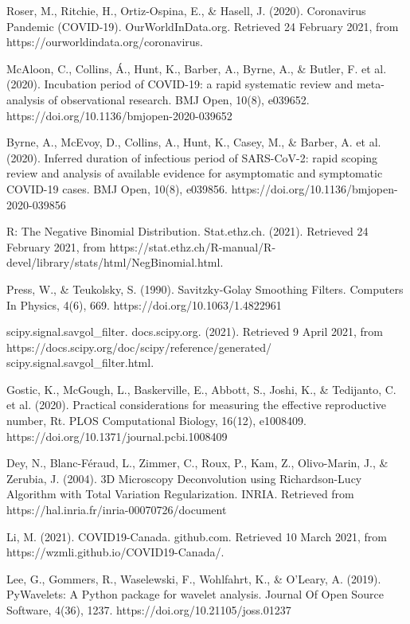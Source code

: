 \documentclass{article}
\begin{document}
{\begin{thebibliography}{2}

Roser, M., Ritchie, H., Ortiz-Ospina, E., \& Hasell, J. (2020). Coronavirus Pandemic (COVID-19). OurWorldInData.org. Retrieved 24 February 2021, from https://ourworldindata.org/coronavirus.

McAloon, C., Collins, Á., Hunt, K., Barber, A., Byrne, A., \& Butler, F. et al. (2020). Incubation period of COVID-19: a rapid systematic review and meta-analysis of observational research. BMJ Open, 10(8), e039652. https://doi.org/10.1136/bmjopen-2020-039652

Byrne, A., McEvoy, D., Collins, A., Hunt, K., Casey, M., \& Barber, A. et al. (2020). Inferred duration of infectious period of SARS-CoV-2: rapid scoping review and analysis of available evidence for asymptomatic and symptomatic COVID-19 cases. BMJ Open, 10(8), e039856. https://doi.org/10.1136/bmjopen-2020-039856

R: The Negative Binomial Distribution. Stat.ethz.ch. (2021). Retrieved 24 February 2021, from https://stat.ethz.ch/R-manual/R-devel/library/stats/html/NegBinomial.html.

Press, W., \& Teukolsky, S. (1990). Savitzky-Golay Smoothing Filters. Computers In Physics, 4(6), 669. https://doi.org/10.1063/1.4822961
    
scipy.signal.savgol\_filter. docs.scipy.org. (2021). Retrieved 9 April 2021, from https://docs.scipy.org/doc/scipy/reference/generated/ scipy.signal.savgol\_filter.html.

Gostic, K., McGough, L., Baskerville, E., Abbott, S., Joshi, K., \& Tedijanto, C. et al. (2020). Practical considerations for measuring the effective reproductive number, Rt. PLOS Computational Biology, 16(12), e1008409. https://doi.org/10.1371/journal.pcbi.1008409

Dey, N., Blanc-Féraud, L., Zimmer, C., Roux, P., Kam, Z., Olivo-Marin, J., \& Zerubia, J. (2004). 3D Microscopy Deconvolution using Richardson-Lucy Algorithm with Total Variation Regularization. INRIA. Retrieved from https://hal.inria.fr/inria-00070726/document

Li, M. (2021). COVID19-Canada. github.com. Retrieved 10 March 2021, from https://wzmli.github.io/COVID19-Canada/.

Lee, G., Gommers, R., Waselewski, F., Wohlfahrt, K., \& O'Leary, A. (2019). PyWavelets: A Python package for wavelet analysis. Journal Of Open Source Software, 4(36), 1237. https://doi.org/10.21105/joss.01237


\end{thebibliography}}
\end{document}
